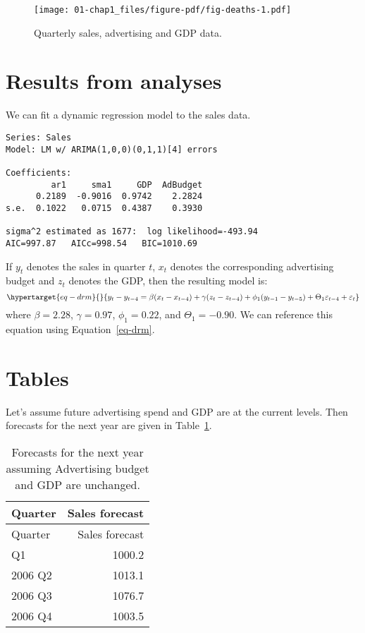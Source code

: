 \documentclass{uniexeterthesis}
\begin{document}
\begin{figure}

{\centering \texttt{[image: 01-chap1\_files/figure-pdf/fig-deaths-1.pdf]}

}

\caption{\label{fig-deaths}Quarterly sales, advertising and GDP data.}

\end{figure}

\hypertarget{results-from-analyses}{%
\section{Results from analyses}\label{results-from-analyses}}

We can fit a dynamic regression model to the sales data.

\begin{verbatim}
Series: Sales
Model: LM w/ ARIMA(1,0,0)(0,1,1)[4] errors

Coefficients:
         ar1     sma1     GDP  AdBudget
      0.2189  -0.9016  0.9742    2.2824
s.e.  0.1022   0.0715  0.4387    0.3930

sigma^2 estimated as 1677:  log likelihood=-493.94
AIC=997.87   AICc=998.54   BIC=1010.69
\end{verbatim}

If \(y_t\) denotes the sales in quarter \(t\), \(x_t\) denotes the
corresponding advertising budget and \(z_t\) denotes the GDP, then the
resulting model is: \begin{equation}\protect\hypertarget{eq-drm}{}{
  y_t - y_{t-4} = \beta (x_t-x_{t-4}) + \gamma (z_t-z_{t-4}) + \phi_1 (y_{t-1} - y_{t-5}) + \Theta_1 \varepsilon_{t-4} + \varepsilon_t
}\label{eq-drm}\end{equation} where \(\beta = 2.28\), \(\gamma = 0.97\),
\(\phi_1 = 0.22\), and \(\Theta_1 = -0.90\). We can reference this
equation using Equation~\ref{eq-drm}.

\hypertarget{tables}{%
\section{Tables}\label{tables}}

Let's assume future advertising spend and GDP are at the current levels.
Then forecasts for the next year are given in
Table~\ref{tbl-salesforecasts}.

\hypertarget{tbl-salesforecasts}{}
\begin{longtable}[]{@{}lr@{}}
\caption{\label{tbl-salesforecasts}Forecasts for the next year assuming
Advertising budget and GDP are unchanged.}\tabularnewline
\toprule\noalign{}
Quarter & Sales forecast \\
\midrule\noalign{}
\endfirsthead
\toprule\noalign{}
Quarter & Sales forecast \\
\midrule\noalign{}
\endhead
\bottomrule\noalign{}
\endlastfoot
2006 Q1 & 1000.2 \\
2006 Q2 & 1013.1 \\
2006 Q3 & 1076.7 \\
2006 Q4 & 1003.5 \\
\end{longtable}
\end{document}
